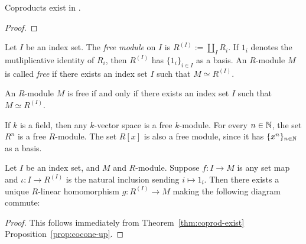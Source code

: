 \begin{theorem}\label{thm:coprod-exist}
	Coproducts exist in .
\end{theorem}
	{\color{red}
	\begin{proof}
			
	\end{proof}}

\begin{definition}
	Let $I$ be an index set. The \emph{free module} on $I$ is $R^{(I)} := \coprod_{I}R_i$. If $1_i$ denotes the mutliplicative identity of $R_i$, then $R^{(I)}$ has $\{1_i\}_{i \in I}$ as a basis. An $R$-module $M$ is called \emph{free} if there exists an index set $I$ such that $M \simeq R^{(I)}$.
\end{definition}

\begin{corollary}
	An $R$-module $M$ is free if and only if there exists an index set $I$ such that $M \simeq R^{(I)}$.
\end{corollary}

\begin{example}
	If $k$ is a field, then any $k$-vector space is a free $k$-module. For every $n \in \mathbb{N}$, the set $R^n$ is a free $R$-module. The set $R[x]$ is also a free module, since it has $\{x^n\}_{n \in \mathbb{N}}$ as a basis.
\end{example}

\begin{theorem}
	Let $I$ be an index set, and $M$ and $R$-module. Suppose $f:I \rightarrow M$ is any set map and $\iota : I \rightarrow R^{(I)}$ is the natural inclusion sending $i \mapsto 1_i$. Then there exists a unique $R$-linear homomorphism $g:R^{(I)} \rightarrow M$ making the following diagram commute:
	\begin{center}
	\end{center}
\end{theorem}
	\begin{proof}
		This follows immediately from Theorem~\ref{thm:coprod-exist} Proposition~\ref{prop:cocone-up}.
	\end{proof}

